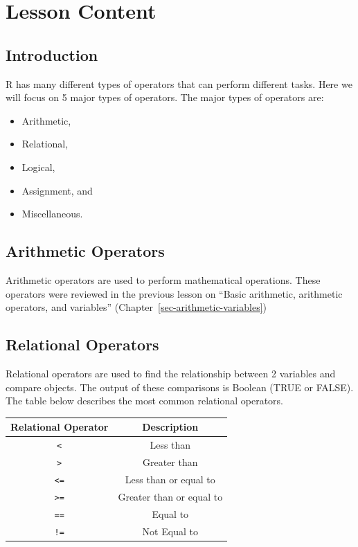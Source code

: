 \documentclass[
  letterpaper,
  DIV=11,
  numbers=noendperiod]{scrreprt}
\providecommand{\tightlist}{%
  \setlength{\itemsep}{0pt}\setlength{\parskip}{0pt}}\usepackage{longtable,booktabs,array}
\begin{document}
\section{Lesson Content}\label{lesson-content-6}

\subsection{Introduction}\label{introduction-4}

R has many different types of operators that can perform different
tasks. Here we will focus on 5 major types of operators. The major types
of operators are:

\begin{itemize}
\tightlist
\item
  Arithmetic,
\item
  Relational,
\item
  Logical,
\item
  Assignment, and
\item
  Miscellaneous.
\end{itemize}

\subsection{Arithmetic Operators}\label{arithmetic-operators-1}

Arithmetic operators are used to perform mathematical operations. These
operators were reviewed in the previous lesson on ``Basic arithmetic,
arithmetic operators, and variables''
(Chapter~\ref{sec-arithmetic-variables})

\subsection{Relational Operators}\label{relational-operators}

Relational operators are used to find the relationship between 2
variables and compare objects. The output of these comparisons is
Boolean (TRUE or FALSE). The table below describes the most common
relational operators.

\begin{longtable}[]{@{}cc@{}}
\toprule\noalign{}
Relational Operator & Description \\
\midrule\noalign{}
\endhead
\bottomrule\noalign{}
\endlastfoot
\texttt{\textless{}} & Less than \\
\texttt{\textgreater{}} & Greater than \\
\texttt{\textless{}=} & Less than or equal to \\
\texttt{\textgreater{}=} & Greater than or equal to \\
\texttt{==} & Equal to \\
\texttt{!=} & Not Equal to \\
\end{longtable}
\end{document}
